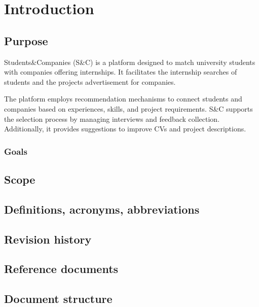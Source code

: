 \chapter{Introduction}

\section{Purpose}

Students\&Companies (S\&C) is a platform designed to match university students with companies offering internships.
It facilitates the internship searches of students and the projects advertisement for companies.

The platform employs recommendation mechanisms to connect students and companies based on experiences, skills, and project requirements.
S\&C supports the selection process by managing interviews and feedback collection.
Additionally, it provides suggestions to improve CVs and project descriptions.

\subsection{Goals}



\section{Scope}

\section{Definitions, acronyms, abbreviations}

\section{Revision history}

\section{Reference documents}

\section{Document structure}
